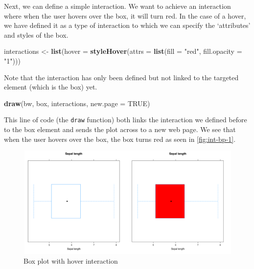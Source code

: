 \documentclass[11pt,]{report}
\newenvironment{Shaded}{\begin{snugshade}}{\end{snugshade}}
\newcommand{\KeywordTok}[1]{\textcolor[rgb]{0.13,0.29,0.53}{\textbf{#1}}}
\newcommand{\DataTypeTok}[1]{\textcolor[rgb]{0.13,0.29,0.53}{#1}}
\newcommand{\StringTok}[1]{\textcolor[rgb]{0.31,0.60,0.02}{#1}}
\newcommand{\OtherTok}[1]{\textcolor[rgb]{0.56,0.35,0.01}{#1}}
\newcommand{\NormalTok}[1]{#1}
\begin{document}
Next, we can define a simple interaction. We want to achieve an
interaction where when the user hovers over the box, it will turn red.
In the case of a hover, we have defined it as a type of interaction to
which we can specify the `attributes' and styles of the box.

\begin{Shaded}
\begin{Highlighting}[]
\NormalTok{interactions <-}\StringTok{ }\KeywordTok{list}\NormalTok{(}\DataTypeTok{hover =} \KeywordTok{styleHover}\NormalTok{(}\DataTypeTok{attrs =} \KeywordTok{list}\NormalTok{(}\DataTypeTok{fill =} \StringTok{"red"}\NormalTok{,}
                                                     \DataTypeTok{fill.opacity =} \StringTok{"1"}\NormalTok{)))}
\end{Highlighting}
\end{Shaded}

Note that the interaction has only been defined but not linked to the
targeted element (which is the box) yet.

\begin{Shaded}
\begin{Highlighting}[]
\KeywordTok{draw}\NormalTok{(bw, box, interactions, }\DataTypeTok{new.page =} \OtherTok{TRUE}\NormalTok{)}
\end{Highlighting}
\end{Shaded}

This line of code (the \texttt{draw} function) both links the
interaction we defined before to the box element and sends the plot
across to a new web page. We see that when the user hovers over the box,
the box turns red as seen in \autoref{fig:int-bp-1}.

\begin{figure}[H]

{\centering \includegraphics[width=0.7\linewidth,]{./fig/int-bp-1} 

}

\caption{\label{fig:int-bp-1} Box plot with hover interaction}\label{fig:unnamed-chunk-51}
\end{figure}
\end{document}
